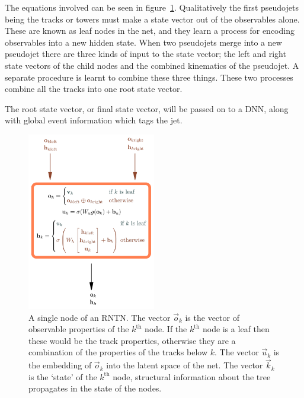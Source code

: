 The equations involved can be seen in figure~\ref{fig:plan_treeTagger}.
Qualitatively the first pseudojets being the tracks or towers must make a state vector out of the observables alone.
These are known as leaf nodes in the net, and they learn a process for encoding observables into a new hidden state.
When two pseudojets merge into a new pseudojet there are three kinds of input to the state vector;
the left and right state vectors of the child nodes and the combined kinematics of the pseudojet.
A separate procedure is learnt to combine these three things.
These two processes combine all the tracks into one root state vector.

The root state vector, or final state vector, will be passed on to a DNN,
along with global event information which tags the jet.


\begin{figure}
    \centering
    \includegraphics[width=0.5\textwidth]{images/plan_treetagger.png}
    \caption{A single node of an RNTN.
        The vector \(\vec{o}_k\) is the vector of observable properties of the \(k^\text{th}\) node. 
        If the \(k^\text{th}\) node is a leaf then these would be the track properties, otherwise they are a combination of the properties of the tracks below \(k\).
        The vector \(\vec{u}_k\) is the embedding of \(\vec{o}_k\) into the latent space of the net.
        The vector \(\vec{k}_k\) is the `state' of the \(k^\text{th}\) node, structural information about the tree propagates in the state of the nodes.
    }
    \label{fig:plan_treeTagger}
\end{figure}

